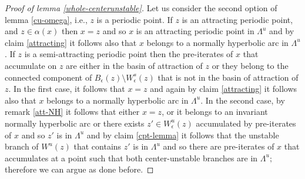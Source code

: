 \documentclass[a4paper,11pt]{article}
\theoremstyle{definition}
\def\La{\Lambda}
\def\la{\lambda}
\def\e{\epsilon}
\def\de{\delta}
\def\La{\Lambda}
\begin{document}
\begin{proof}[Proof of lemma \ref{whole-centerunstable}]







Let us consider the second option of lemma  \ref{cu-omega}, i.e., $z$ is a periodic point. If $z$ is an attracting periodic point, and $z\in \alpha(x)$ then $x=z$ and so $x$ is an attracting periodic point in $\La^u$ and by claim \ref{attracting} it follows also  that $x$ belongs to a normally hyperbolic arc in $\La^u$. If $z$ is a semi-attracting periodic point then  the pre-iterates of $x$ that accumulate on $z$ are either in the basin of attraction of $z$ or they belong to the connected component of $B_\e(z)\setminus W^s_\e(z)$ that is not in the basin of attraction of $z.$ In the first case, it follows that $x=z$ and again by claim \ref{attracting} it follows also  that $x$ belongs to a normally hyperbolic arc in $\La^u$. In the second case, by remark \ref{att-NH} it follows that either $x=z$, or  it belongs to an invariant normally hyperbolic arc or there exists $z'\in W^u_{\e}(z)$ accumulated by pre-iterates of $x$ and so $z'$ is in $\La^u$ and by claim \ref{cpt-lemma} it follows that the unstable branch of $W^u(z)$ that contains $z'$ is in $\La^u$ and so there are pre-iterates of $x$ that accumulates at a point such that both center-unstable branches are in $\La^u;$ therefore we can argue as done before.


\end{proof}
\end{document}
